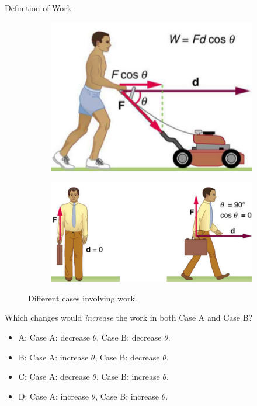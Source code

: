 \documentclass{beamer}
\begin{document}
\begin{frame}{Definition of Work}
\begin{figure}
\centering
\begin{subfigure}{0.3\textwidth}
\centering
\includegraphics[width=\textwidth]{figures/lawn1.png}
\caption{}
\end{subfigure}
\begin{subfigure}{0.2\textwidth}
\centering
\includegraphics[width=\textwidth,trim=12cm 0cm 0cm 0cm,clip=true]{figures/lawn2.png}
\caption{}
\end{subfigure}
\caption{\label{fig:workvisual4} Different cases involving work.}
\end{figure}
\small
Which changes would \textit{increase} the work in both Case A and Case B?
\begin{itemize}
\item A: Case A: decrease $\theta$, Case B: decrease $\theta$.
\item B: Case A: increase $\theta$, Case B: decrease $\theta$.
\item C: Case A: decrease $\theta$, Case B: increase $\theta$.
\item D: Case A: increase $\theta$, Case B: increase $\theta$.
\end{itemize}
\end{frame}
\end{document}
